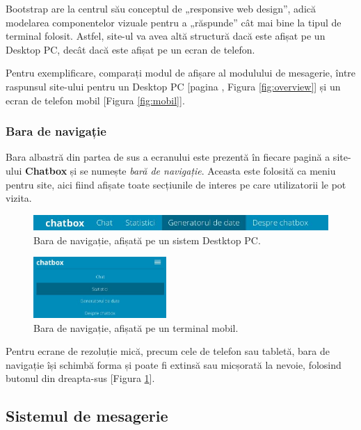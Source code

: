 \documentclass[12pt,a4paper]{article}
\begin{document}
Bootstrap are la centrul său conceptul de „responsive web design\cite{rwd}”, adică modelarea componentelor
vizuale pentru a „răspunde” cât mai bine la tipul de terminal folosit. Astfel, site-ul va avea altă structură dacă este afișat pe un Desktop PC, decât dacă este afișat pe un ecran de telefon.

Pentru exemplificare, comparați modul de afișare al modulului de mesagerie, între 
raspunsul site-ului pentru un Desktop PC [pagina \pageref{fig:overview}, Figura \ref{fig:overview}] și un ecran de telefon mobil [Figura \ref{fig:mobil}].

\subsubsection{Bara de navigație}
Bara albastră din partea de sus a ecranului este prezentă în fiecare pagină  
a site-ului \textbf{Chatbox} și se numește \textit{bară de navigație}. Aceasta 
este folosită ca meniu pentru site, aici fiind afișate toate secțiunile de interes
pe care utilizatorii le pot vizita. 

\begin{figure}[!h]
	\centering
	\includegraphics[width=\textwidth]{img/meniu_mare.jpg}
	\vspace{-15px}
	\caption{Bara de navigație, afișată pe un sistem Destktop PC.}
\end{figure}

\begin{figure}[!h]
	\centering
	\includegraphics[width=0.45\textwidth]{img/meniu_mobil.jpg}
	\caption{Bara de navigație, afișată pe un terminal mobil.}
	\label{fig:nav-mobil}
\end{figure}

Pentru ecrane de rezoluție mică, precum cele de telefon sau tabletă, 
bara de navigație își schimbă forma și poate fi extinsă sau micșorată la nevoie, 
folosind butonul din dreapta-sus [Figura \ref{fig:nav-mobil}].

\subsection{Sistemul de mesagerie}
\end{document}
